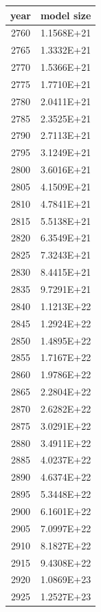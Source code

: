 \documentclass[a4paper]{article}
\begin{document}
    \begin{tabular}{| c | c |}
    	\hline
    	year & model size \\\hline
    	2760 & 1.1568E+21 \\\hline
    	2765 & 1.3332E+21 \\\hline
    	2770 & 1.5366E+21 \\\hline
    	2775 & 1.7710E+21 \\\hline
    	2780 & 2.0411E+21 \\\hline
    	2785 & 2.3525E+21 \\\hline
    	2790 & 2.7113E+21 \\\hline
    	2795 & 3.1249E+21 \\\hline
    	2800 & 3.6016E+21 \\\hline
    	2805 & 4.1509E+21 \\\hline
    	2810 & 4.7841E+21 \\\hline
    	2815 & 5.5138E+21 \\\hline
    	2820 & 6.3549E+21 \\\hline
    	2825 & 7.3243E+21 \\\hline
    	2830 & 8.4415E+21 \\\hline
    	2835 & 9.7291E+21 \\\hline
    	2840 & 1.1213E+22 \\\hline
    	2845 & 1.2924E+22 \\\hline
    	2850 & 1.4895E+22 \\\hline
    	2855 & 1.7167E+22 \\\hline
    	2860 & 1.9786E+22 \\\hline
    	2865 & 2.2804E+22 \\\hline
    	2870 & 2.6282E+22 \\\hline
    	2875 & 3.0291E+22 \\\hline
    	2880 & 3.4911E+22 \\\hline
    	2885 & 4.0237E+22 \\\hline
    	2890 & 4.6374E+22 \\\hline
    	2895 & 5.3448E+22 \\\hline
    	2900 & 6.1601E+22 \\\hline
    	2905 & 7.0997E+22 \\\hline
    	2910 & 8.1827E+22 \\\hline
    	2915 & 9.4308E+22 \\\hline
    	2920 & 1.0869E+23 \\\hline
    	2925 & 1.2527E+23 \\\hline

\end{tabular}
\end{document}
